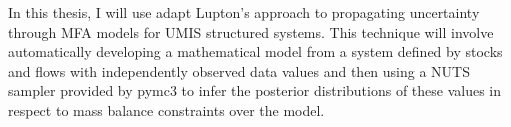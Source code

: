 \documentclass[ %
                    author={Tom Jager},
                supervisor={Dr. Daniel Schien},
                    degree={MEng},
                     title={A Bayesian Inference Engine for UMIS Structured Data},
                  subtitle={},
                      type={research},
                      year={2019} ]{dissertation}
\begin{document}
In this thesis, I will use adapt Lupton's approach to  propagating uncertainty through MFA models for UMIS structured systems. This technique will involve automatically developing a mathematical model from a system defined by stocks and flows with independently observed data values and then using a NUTS sampler provided by pymc3 to infer the posterior distributions of these values in respect to mass balance constraints over the model. 

\end{document}
